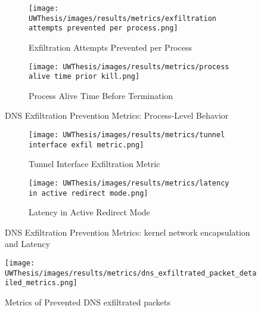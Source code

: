 \documentclass [11pt, proquest] {uwthesis}[2020/02/24]
\begin{document}
\begin{figure}[htbp]
  \centering
  \begin{subfigure}[b]{0.48\textwidth}
    \texttt{[image: UWThesis/images/results/metrics/exfiltration attempts prevented per process.png]}
    \caption{Exfiltration Attempts Prevented per Process}
  \end{subfigure}
  \hfill
  \begin{subfigure}[b]{0.48\textwidth}
    \texttt{[image: UWThesis/images/results/metrics/process alive time prior kill.png]}
    \caption{Process Alive Time Before Termination}
  \end{subfigure}
  \caption{DNS Exfiltration Prevention Metrics: Process-Level Behavior}
  \label{fig:p1}
\end{figure}

\begin{figure}[htbp]
  \centering
  \begin{subfigure}[b]{0.48\textwidth}
    \texttt{[image: UWThesis/images/results/metrics/tunnel interface exfil metric.png]}
    \caption{Tunnel Interface Exfiltration Metric}
  \end{subfigure}
  \hfill
  \begin{subfigure}[b]{0.48\textwidth}
    \texttt{[image: UWThesis/images/results/metrics/latency in active redirect mode.png]}
    \caption{Latency in Active Redirect Mode}
  \end{subfigure}
  \caption{DNS Exfiltration Prevention Metrics: kernel network encapsulation and Latency}
    \label{fig:p2}
\end{figure}

\begin{figure}[H]
    \centering
    \texttt{[image: UWThesis/images/results/metrics/dns\_exfiltrated\_packet\_detailed\_metrics.png]}
    \caption{Metrics of Prevented DNS exfiltrated packets}
    \label{fig:dns-exfil-packet-metrics}
\end{figure}

\vspace{-25pt}
\end{document}
